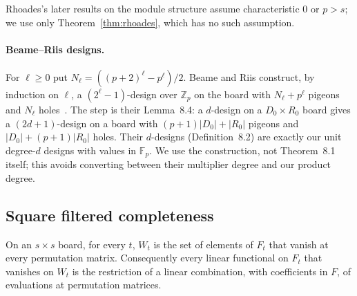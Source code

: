 Rhoades's later results on the module structure assume characteristic $0$ or $p>s$; we use
only Theorem~\ref{thm:rhoades}, which has no such assumption.

\paragraph{Beame--Riis designs.}  For $\ell\ge0$ put $N_\ell=((p+2)^\ell-p^\ell)/2$.
Beame and Riis construct, by induction on $\ell$, a $(2^\ell-1)$-design over
$\mathbb Z_p$ on the board with $N_\ell+p^\ell$ pigeons and $N_\ell$
holes~\cite[proof of Thm.~8.1]{beame1998counting}.  The step is their Lemma~8.4: a
$d$-design on a $D_0\times R_0$ board gives a $(2d+1)$-design on a board with
$(p+1)|D_0|+|R_0|$ pigeons and $|D_0|+(p+1)|R_0|$ holes.  Their $d$-designs
(Definition~8.2) are exactly our unit degree-$d$ designs with values in $\mathbb F_p$.  We
use the construction, not Theorem~8.1 itself; this avoids converting between their
multiplier degree and our product degree.

\subsection{Square filtered completeness}\label{sec:growth-square}

\begin{lemma}\label{lem:square-complete}
On an $s\times s$ board, for every $t$, $W_t$ is the set of elements of $F_t$ that vanish
at every permutation matrix.  Consequently every linear functional on $F_t$ that vanishes on
$W_t$ is the restriction of a linear combination, with coefficients in $F$, of evaluations at
permutation matrices.
\end{lemma}


